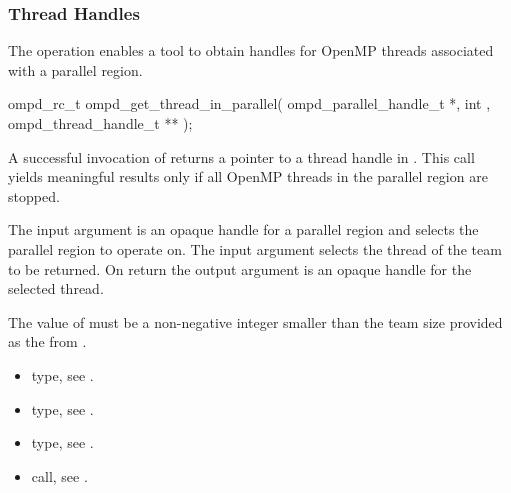 \subsubsection{Thread Handles}

\label{subsubsubsec:ompd_get_thread_in_parallel}
\summary
The   operation enables a tool to obtain handles for
OpenMP threads associated with a parallel region.

\format

\begin{cspecific}
\begin{ompSyntax}
ompd_rc_t ompd_get_thread_in_parallel(
  ompd_parallel_handle_t *,
  int ,
  ompd_thread_handle_t **
);
\end{ompSyntax}
\end{cspecific}


\descr
A successful invocation of   returns a pointer to
a thread handle in .
This call yields meaningful results only if all OpenMP threads in the parallel
region are stopped.

\argdesc
The input argument  is an opaque handle for a parallel region
 and selects the parallel region to operate on.
The input argument  selects the thread of the team to be returned.
On return the output argument  is an opaque handle for the selected thread.

\restrictions
The value of  must be a non-negative integer smaller than the
team size provided as the  from .

\crossreferences
\begin{itemize}
  \item {} type, see .
	\item {} type, see .
	\item {} type, see .
	\item {} call, see 
	.
\end{itemize}

